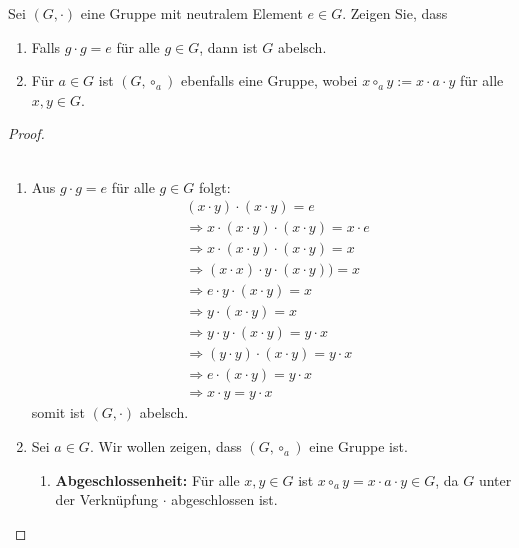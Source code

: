 \documentclass{../problemset}
\begin{document}
\begin{problem}
Sei $(G, \cdot)$ eine Gruppe mit neutralem Element $e \in G$. Zeigen Sie, dass
\begin{enumerate}
	\item Falls $g \cdot g = e$ für alle $g \in G$, dann ist $G$ abelsch.
	\item Für $a \in G$ ist $(G, \circ_a)$ ebenfalls eine Gruppe, wobei $x \circ_a y := x \cdot a \cdot y$ für alle $x, y \in G$.
\end{enumerate}
\begin{proof}
	\\\
	\begin{enumerate}
		\item Aus $g \cdot g = e$ für alle $g \in G$ folgt: \begin{align*}
			       & (x \cdot y) \cdot (x \cdot y) = e \tag{$x \cdot y \in G \Longrightarrow \exists g \in G: g \cdot g = e$} \\
			       & \Longrightarrow x \cdot (x \cdot y) \cdot (x \cdot y) = x \cdot e                                        \\
			       & \Longrightarrow x \cdot (x \cdot y) \cdot (x \cdot y) = x                                                \\
			       & \Longrightarrow (x \cdot x) \cdot y \cdot (x \cdot y)) = x                                               \\
			       & \Longrightarrow e \cdot y \cdot (x \cdot y) = x                                                          \\
			       & \Longrightarrow y \cdot (x \cdot y) = x                                                                  \\
			       & \Longrightarrow y \cdot y \cdot (x \cdot y) = y \cdot x                                                  \\
			       & \Longrightarrow (y \cdot y) \cdot (x \cdot y) = y \cdot x                                                \\
			       & \Longrightarrow e \cdot (x \cdot y) = y \cdot x                                                          \\
			       & \Longrightarrow x \cdot y = y \cdot x
		      \end{align*}
		      somit ist $(G, \cdot)$ abelsch. \checkmark

		\item Sei $a \in G$. Wir wollen zeigen, dass $(G, \circ_a)$ eine Gruppe ist.
		      \begin{enumerate}
			      \item \textbf{Abgeschlossenheit:} Für alle $x, y \in G$ ist $x \circ_a y = x \cdot a \cdot y \in G$, da $G$ unter der Verknüpfung $\cdot$ abgeschlossen ist.


\end{enumerate}
\end{enumerate}
\end{proof}
\end{problem}
\end{document}
